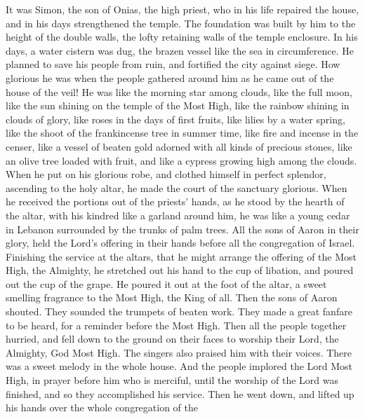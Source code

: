  It was Simon, the son of Onias, the high priest, who in his
life repaired the house, and in his days strengthened the temple.
 The foundation was built by him to the height of the double
walls, the lofty retaining walls of the temple enclosure. 
In his days, a water cistern was dug, the brazen vessel like the sea in
circumference.  He planned to save his people from ruin, and
fortified the city against siege.  How glorious he was when
the people gathered around him as he came out of the house of the veil!
 He was like the morning star among clouds, like the full
moon,  like the sun shining on the temple of the Most High,
like the rainbow shining in clouds of glory,  like roses in
the days of first fruits, like lilies by a water spring, like the shoot
of the frankincense tree in summer time,  like fire and
incense in the censer, like a vessel of beaten gold adorned with all
kinds of precious stones,  like an olive tree loaded with
fruit, and like a cypress growing high among the clouds. 
When he put on his glorious robe, and clothed himself in perfect
splendor, ascending to the holy altar, he made the court of the
sanctuary glorious.  When he received the portions out of
the priests' hands, as he stood by the hearth of the altar, with his
kindred like a garland around him, he was like a young cedar in Lebanon
surrounded by the trunks of palm trees.  All the sons of
Aaron in their glory, held the Lord's offering in their hands before all
the congregation of Israel.  Finishing the service at the
altars, that he might arrange the offering of the Most High, the
Almighty,  he stretched out his hand to the cup of
libation, and poured out the cup of the grape. He poured it out at the
foot of the altar, a sweet smelling fragrance to the Most High, the King
of all.  Then the sons of Aaron shouted. They sounded the
trumpets of beaten work. They made a great fanfare to be heard, for a
reminder before the Most High.  Then all the people
together hurried, and fell down to the ground on their faces to worship
their Lord, the Almighty, God Most High.  The singers also
praised him with their voices. There was a sweet melody in the whole
house.  And the people implored the Lord Most High, in
prayer before him who is merciful, until the worship of the Lord was
finished, and so they accomplished his service.  Then he
went down, and lifted up his hands over the whole congregation of the
